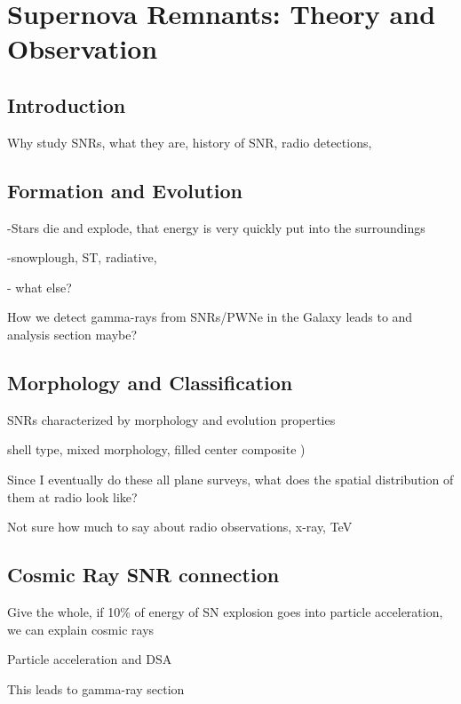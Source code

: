 \chapter{Supernova Remnants: Theory and  Observation}
\label{chap:Rems}

\section{Introduction}\label{Rems:intro}
Why study SNRs, what they are, history of SNR,  radio detections, 



\section{\label{Rems:evo}Formation and Evolution}

-Stars die and explode, that energy is very quickly put into the surroundings
    
-snowplough, ST, radiative,
    
- what else?

How we detect gamma-rays from SNRs/PWNe in the Galaxy leads to and analysis section maybe?
\section{\label{Rems:obs}Morphology and Classification}

SNRs characterized by morphology and evolution properties

shell type, mixed morphology, filled center  composite )

Since I eventually do these all plane surveys, what does the spatial  distribution of them at radio look like?

Not sure how much to say about radio observations, x-ray, TeV

\section{\label{Rems:CR}Cosmic Ray SNR connection}

Give the whole, if 10\% of energy of SN explosion goes into particle acceleration, we can explain cosmic rays

Particle acceleration and DSA

This leads to gamma-ray section

	
